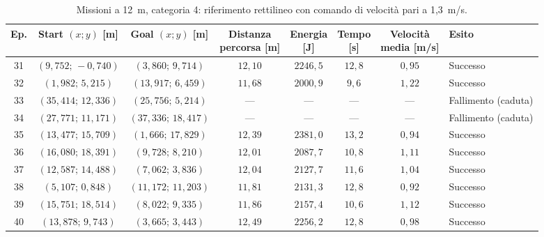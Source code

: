 \begin{table}[H]
\centering
\caption{Missioni a 12~m, categoria 4: riferimento rettilineo con comando di velocità pari a 1,3~m/s.}
\label{tab:straight-line-1-3-12m-cat4}
\begingroup
\fontsize{9}{11}\selectfont
\setlength{\tabcolsep}{2.5pt}
\renewcommand{\arraystretch}{1.2}
\begin{tabular}{@{}c cc cccc l@{}}
\toprule
Ep. & \shortstack{Start $(x;y)$\\{}[m]} & \shortstack{Goal $(x;y)$\\{}[m]} & \shortstack{Distanza\\percorsa [m]} & \shortstack{Energia\\{}[J]} & \shortstack{Tempo\\{}[s]} & \shortstack{Velocità\\media [m/s]} & Esito \\
\midrule
31 & $(9{,}752;\,-0{,}740)$ & $(3{,}860;\,9{,}714)$ & $12{,}10$ & $2246{,}5$ & $12{,}8$ & $0{,}95$ & Successo \\
32 & $(1{,}982;\,5{,}215)$ & $(13{,}917;\,6{,}459)$ & $11{,}68$ & $2000{,}9$ & $9{,}6$ & $1{,}22$ & Successo \\
33 & $(35{,}414;\,12{,}336)$ & $(25{,}756;\,5{,}214)$ & --- & --- & --- & --- & Fallimento (caduta) \\
34 & $(27{,}771;\,11{,}171)$ & $(37{,}336;\,18{,}417)$ & --- & --- & --- & --- & Fallimento (caduta) \\
35 & $(13{,}477;\,15{,}709)$ & $(1{,}666;\,17{,}829)$ & $12{,}39$ & $2381{,}0$ & $13{,}2$ & $0{,}94$ & Successo \\
36 & $(16{,}080;\,18{,}391)$ & $(9{,}728;\,8{,}210)$ & $12{,}01$ & $2087{,}7$ & $10{,}8$ & $1{,}11$ & Successo \\
37 & $(12{,}587;\,14{,}488)$ & $(7{,}062;\,3{,}836)$ & $12{,}04$ & $2127{,}7$ & $11{,}6$ & $1{,}04$ & Successo \\
38 & $(5{,}107;\,0{,}848)$ & $(11{,}172;\,11{,}203)$ & $11{,}81$ & $2131{,}3$ & $12{,}8$ & $0{,}92$ & Successo \\
39 & $(15{,}751;\,18{,}514)$ & $(8{,}022;\,9{,}335)$ & $11{,}86$ & $2157{,}4$ & $10{,}6$ & $1{,}12$ & Successo \\
40 & $(13{,}878;\,9{,}743)$ & $(3{,}665;\,3{,}443)$ & $12{,}49$ & $2256{,}2$ & $12{,}8$ & $0{,}98$ & Successo \\
\bottomrule
\end{tabular}
\endgroup
\end{table}
